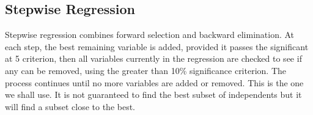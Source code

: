 \documentclass[a4paper,12pt]{article}
\begin{document}
\subsection{Stepwise Regression}
Stepwise regression combines forward selection and backward elimination. At each
step, the best remaining variable is added, provided it passes the significant at 5%
criterion, then all variables currently in the regression are checked to see if any can be
removed, using the greater than 10\% significance criterion. The process continues
until no more variables are added or removed. This is the one we shall use. It is not
guaranteed to find the best subset of independents but it will find a subset close to the
best.

\end{document}
